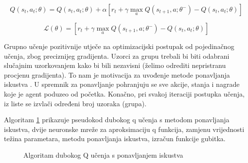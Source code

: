 \begin{equation}
    \label{md:dqn-bellman}
    Q(s_t, a_t; \theta) = Q(s_t, a_t; \theta) + \alpha \left[ r_t + \gamma \max_a Q(s_{t+1}, a; \theta^-) - Q(s_t, a_t; \theta) \right]
\end{equation}

\begin{equation}
    \label{md:dqn-loss}
    \mathcal{L}(\theta) = \left[ r_t + \gamma \max_a Q(s_{t+1}, a; \theta^-) - Q(s_t, a_t; \theta) \right]
\end{equation}

\bigskip


Grupno  učenje pozitivnije utječe na optimizacijski postupak od pojedinačnog učenja, zbog preciznijeg gradijenta. Uzorci za grupu trebali bi biti odabrani slučajnim uzorkovanjem kako bi bili nezavisni (želimo odrediti nepristranu procjenu gradijenta). To nam je motivacija za uvođenje metode ponavljanja iskustva . U spremnik za ponavljanje  pohranjuju se sve akcije, stanja i nagrade koje je agent poduzeo od početka. Konačno, pri svakoj iteraciji postupka učenja, iz liste se izvlači određeni broj uzoraka (grupa).


Algoritam \ref{fig:dql-algorithm} prikazuje pseudokod dubokog q učenja s metodom ponavljanja iskustva, dvije neuronske mreže za aproksimaciju q funkcija, zamjenu vrijednosti težina parametara, metodu ponavljanja iskustva, izračun funkcije gubitka. 

\begin{figure}[H]
    \centering
    \caption{Algoritam dubokog Q učenja s ponavljanjem iskustva}
    \label{fig:dql-algorithm}
\end{figure}

